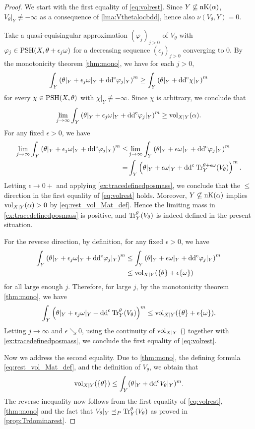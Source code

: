 \begin{proof}
We start with the first equality of \eqref{eq:volrest}. Since $Y\not\subseteq \operatorname{nK}(\alpha)$, $V_{\theta}|_Y \not \equiv -\infty$ as a consequence of \cref{lma:Vthetalocbdd}, hence also $\nu(V_{\theta},Y)=0$.

Take a quasi-equisingular approximation $(\varphi_j)_{j>0}$ of $V_{\theta}$ with $\varphi_j\in \mathrm{PSH}(X,\theta+\epsilon_j\omega)$ for a decreasing sequence $(\epsilon_j)_{j>0}$ converging to $0$. By the monotonicity theorem \cref{thm:mono}, we have for each $j>0$,
\[
    \int_Y \left(\theta|_Y+\epsilon_j\omega|_Y+\mathrm{dd}^{\mathrm{c}} \varphi_j|_Y\right)^m\geq \int_Y \left(\theta|_Y+\mathrm{dd}^{\mathrm{c}}\chi|_Y\right)^m
\]
for every $\chi\in \mathrm{PSH}(X,\theta)$ with $\chi|_Y\not\equiv -\infty$. Since $\chi$ is arbitrary, we conclude that
\[
    \lim_{j\to\infty}\int_Y \left(\theta|_Y+\epsilon_j\omega|_Y+\mathrm{dd}^{\mathrm{c}} \varphi_j|_Y\right)^m\geq \operatorname{vol}_{X|Y}(\alpha).
\]
For any fixed $\epsilon>0$, we have
\[
\begin{split}
\lim_{j\to\infty} \int_Y \left(\theta|_Y+\epsilon_j\omega|_Y+\mathrm{dd}^{\mathrm{c}} \varphi_j|_Y\right)^m\leq & \lim_{j\to\infty} \int_Y \left(\theta|_Y+\epsilon\omega|_Y+\mathrm{dd}^{\mathrm{c}} \varphi_j|_Y\right)^m\\
=& \int_Y \left(\theta|_Y+\epsilon\omega|_Y+\mathrm{dd}^{\mathrm{c}} \operatorname{Tr}_Y^{\theta+\epsilon\omega}(V_{\theta})\right)^m.
\end{split}
\]
Letting $\epsilon\to 0+$ and applying \cref{ex:tracedefinedposmass}, we conclude that the $\leq$ direction in the first equality of \eqref{eq:volrest} holds.
Moreover, $Y\not\subseteq \operatorname{nK}(\alpha)$ implies $\operatorname{vol}_{X|Y}(\alpha)>0$ by \eqref{eq:rest_vol_Mat_def}. Hence the limiting mass in \cref{ex:tracedefinedposmass} is positive, and $\operatorname{Tr}_Y^\theta(V_\theta)$ is indeed defined in the present situation.

   For the reverse direction, by definition, for any fixed $\epsilon>0$, we have
    \[
    \begin{aligned}
    \int_Y \left(\theta|_Y+\epsilon_j\omega|_Y+\mathrm{dd}^{\mathrm{c}}\varphi_j|_Y\right)^m
    &\leq \int_Y \left(\theta|_Y+\epsilon\omega|_Y+\mathrm{dd}^{\mathrm{c}}\varphi_j|_Y\right)^m\\
    &\leq \operatorname{vol}_{X|Y}(\{\theta\}+\epsilon\{\omega\})
    \end{aligned}
    \]
    for all large enough $j$. Therefore, for large $j$, by the monotonicity theorem \cref{thm:mono}, we have
    \[
        \int_Y \left(\theta|_Y+\epsilon_j\omega|_Y+\mathrm{dd}^{\mathrm{c}} \operatorname{Tr}_Y^{\theta}(V_{\theta})\right)^m\leq \operatorname{vol}_{X|Y}(\{\theta\}+\epsilon\{\omega\}).
    \]
    Letting $j\to\infty$ and $\epsilon \searrow 0$, using the continuity of $\operatorname{vol}_{X|Y}$ (\cite[Corollary~4.11]{Mat13}) together with \cref{ex:tracedefinedposmass}, we conclude the first equality of \eqref{eq:volrest}.

Now we address the second equality. Due to \cref{thm:mono}, the defining formula \eqref{eq:rest_vol_Mat_def}, and the definition of $V_\theta$, we obtain that
\[
\operatorname{vol}_{X|Y}(\{\theta\}) \leq \int_Y (\theta|_Y + \mathrm{dd}^{\mathrm{c}} V_\theta|_Y)^m.
\]
The reverse inequality now follows from the first equality of \eqref{eq:volrest}, \cref{thm:mono} and the fact that $V_\theta|_Y \preceq_P \operatorname{Tr}_Y^\theta(V_\theta)$ as proved in \cref{prop:Trdominarest}.
\end{proof}
